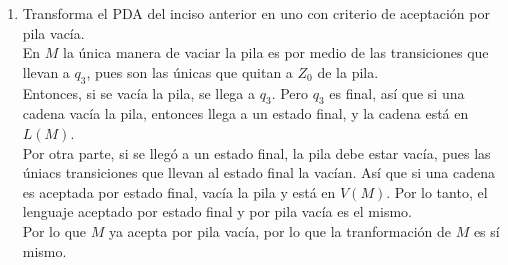 \documentclass{article}
\begin{document}
\begin{enumerate}
{\begin{enumerate}
{\begin{align*}
                &\delta(q_{0}, a, \gamma) = (q_{0}, A\gamma) \\
                &\delta(q_{0}, b, A) = (q_{1}, A) \\
                &\delta(q_{1}, b, A) = (q_{2}, \epsilon) \\
                &\delta(q_{2}, \epsilon, Z_{0}) = (q_{3}, \epsilon) \\
                &\delta(q_{2}, b, A) = (q_{1}, A)
            \end{align*}
            Con representación gráfica
        	\begin{figure}[H]
                \centering
                \caption{Autómata que acepta a $L$ por estado final}
                \label{fib:pda1}
            \end{figure}
        	}
        	\item{
            Transforma el PDA del inciso anterior en uno con criterio de 
            aceptación por pila vacía.\\
            En $M$ la única manera de vaciar la pila es por medio de las
            transiciones que llevan a $q_{3}$, pues son las únicas que quitan a
            $Z_{0}$ de la pila.\\
            Entonces, si se vacía la pila, se llega a $q_{3}$.
            Pero $q_{3}$ es final, así que si una cadena vacía la pila, entonces
            llega a un estado final, y la cadena está en $L(M)$.\\
            Por otra parte, si se llegó a un estado final, la pila debe estar
            vacía, pues las úniacs transiciones que llevan al estado final la
            vacían. Así que si una cadena es aceptada por estado final, vacía la
            pila y está en $V(M)$. Por lo tanto, el lenguaje aceptado por estado
            final y por pila vacía es el mismo.\\
            Por lo que $M$ ya acepta por pila vacía, por lo que la tranformación
            de $M$ es sí mismo.
        	}
        \end{enumerate}
    	}
    \end{enumerate}
\end{document}
